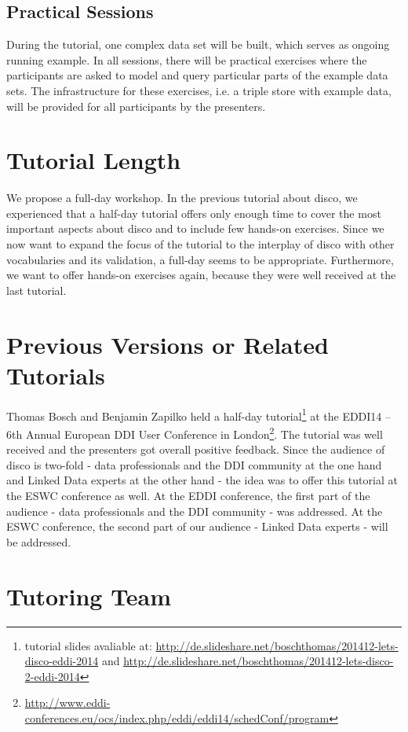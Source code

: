\documentclass{llncs}
\begin{document}
\subsection{Practical Sessions}
During the tutorial, one complex data set will be built, which serves as ongoing running example. In all sessions, there will be practical exercises where the participants are asked to model and query particular parts of the example data sets. The infrastructure for these exercises, i.e. a triple store with example data, will be provided for all participants by the presenters.

\section{Tutorial Length}

We propose a full-day workshop. In the previous tutorial about disco, we experienced that a half-day tutorial offers only enough time to cover the most important aspects about disco and to include few hands-on exercises. Since we now want to expand the focus of the tutorial to the interplay of disco with other vocabularies and its validation, a full-day seems to be appropriate. Furthermore, we want to offer hands-on exercises again, because they were well received at the last tutorial.

\section{Previous Versions or Related Tutorials}

Thomas Bosch and Benjamin Zapilko held a half-day tutorial\footnote{tutorial slides avaliable at: \url{http://de.slideshare.net/boschthomas/201412-lets-disco-eddi-2014} and \url{http://de.slideshare.net/boschthomas/201412-lets-disco-2-eddi-2014}} at the EDDI14 – 6th Annual European DDI User Conference in London\footnote{\url{http://www.eddi-conferences.eu/ocs/index.php/eddi/eddi14/schedConf/program}}.
The tutorial was well received and the presenters got overall positive feedback. Since the audience of disco is two-fold - data professionals and the DDI community at the one hand and Linked Data experts at the other hand - the idea was to offer this tutorial at the ESWC conference as well.
At the EDDI conference, the first part of the audience - data professionals and the DDI community - was addressed.
At the ESWC conference, the second part of our audience - Linked Data experts - will be addressed.

\section{Tutoring Team}
\end{document}
